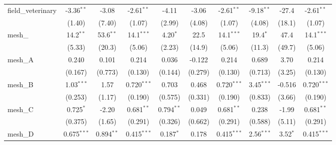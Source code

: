 \begin{tabular}{lccccccccc}
   field\_veterinary                                           & -3.36$^{**}$   & -3.08         & -2.61$^{**}$   & -4.11          & -3.06        & -2.61$^{**}$   & -9.18$^{**}$   & -27.4         & -2.61$^{**}$\\   
                                                               & (1.40)         & (7.40)        & (1.07)         & (2.99)         & (4.08)       & (1.07)         & (4.08)         & (18.1)        & (1.07)\\   
   mesh\_                                                      & 14.2$^{**}$    & 53.6$^{**}$   & 14.1$^{***}$   & 4.20$^{*}$     & 22.5         & 14.1$^{***}$   & 19.4$^{*}$     & 47.4          & 14.1$^{***}$\\   
                                                               & (5.33)         & (20.3)        & (5.06)         & (2.23)         & (14.9)       & (5.06)         & (11.3)         & (49.7)        & (5.06)\\   
   mesh\_A                                                     & 0.240          & 0.101         & 0.214          & 0.036          & -0.122       & 0.214          & 0.689          & 3.70          & 0.214\\   
                                                               & (0.167)        & (0.773)       & (0.130)        & (0.144)        & (0.279)      & (0.130)        & (0.713)        & (3.25)        & (0.130)\\   
   mesh\_B                                                     & 1.03$^{***}$   & 1.57          & 0.720$^{***}$  & 0.703          & 0.468        & 0.720$^{***}$  & 3.45$^{***}$   & -0.516        & 0.720$^{***}$\\   
                                                               & (0.253)        & (1.17)        & (0.190)        & (0.575)        & (0.331)      & (0.190)        & (0.833)        & (3.66)        & (0.190)\\   
   mesh\_C                                                     & 0.725$^{*}$    & -2.20         & 0.681$^{**}$   & 0.794$^{**}$   & 0.049        & 0.681$^{**}$   & 0.238          & -1.99         & 0.681$^{**}$\\   
                                                               & (0.375)        & (1.65)        & (0.291)        & (0.326)        & (0.662)      & (0.291)        & (0.588)        & (5.11)        & (0.291)\\   
   mesh\_D                                                     & 0.675$^{***}$  & 0.894$^{**}$  & 0.415$^{***}$  & 0.187$^{*}$    & 0.178        & 0.415$^{***}$  & 2.56$^{***}$   & 3.52$^{*}$    & 0.415$^{***}$\\   

\end{tabular}
